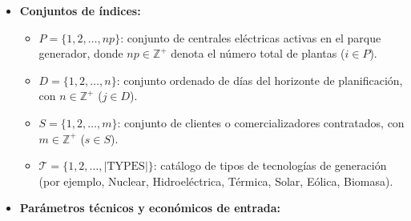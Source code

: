 \begin{itemize}
    \item \textbf{Conjuntos de índices:}
    \begin{itemize}
        \item $P = \{1, 2, \dots, np\}$: conjunto de centrales eléctricas activas en el parque generador, donde $np \in \mathbb{Z}^+$ denota el número total de plantas ($i \in P$).
        \item $D = \{1, 2, \dots, n\}$: conjunto ordenado de días del horizonte de planificación, con $n \in \mathbb{Z}^+$ ($j \in D$).
        \item $S = \{1, 2, \dots, m\}$: conjunto de clientes o comercializadores contratados, con $m \in \mathbb{Z}^+$ ($s \in S$).
        \item $\mathcal{T} = \{1, 2, \dots, |\text{TYPES}|\}$: catálogo de tipos de tecnologías de generación (por ejemplo, Nuclear, Hidroeléctrica, Térmica, Solar, Eólica, Biomasa).
    \end{itemize}

    \item \textbf{Parámetros técnicos y económicos de entrada:}\\
    

\end{itemize}
